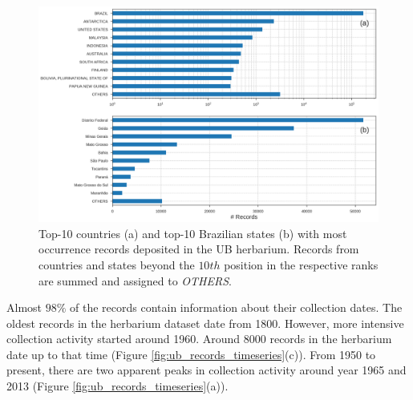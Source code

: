   \begin{figure}[h!]
  	\centering
    \includegraphics[width=\linewidth]{figures/recs_by_cntry_state.png}
    \caption{Top-10 countries (a) and top-10 Brazilian states (b) with most occurrence records deposited in the UB herbarium. Records from countries and states beyond the $10th$ position in the respective ranks are summed and assigned to \textit{OTHERS}.}
    \label{fig:recs_by_cntry_state}
  \end{figure}
  
Almost $98\%$ of the records contain information about their collection dates.
The oldest records in the herbarium dataset date from 1800.
However, more intensive collection activity started around 1960. Around 8000 records in the herbarium date up to that time (Figure \ref{fig:ub_records_timeseries}(c)). 
From 1950 to present, there are two apparent peaks in collection activity around year 1965 and 2013 (Figure \ref{fig:ub_records_timeseries}(a)). %

